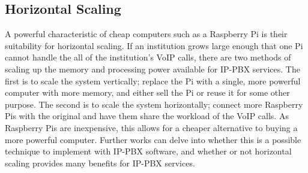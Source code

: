     \subsection{Horizontal Scaling}
        A powerful characteristic of cheap computers such as a Raspberry Pi is their suitability for horizontal scaling. If an institution grows large enough that one Pi cannot handle the all of the institution's VoIP calls, there are two methods of scaling up the memory and processing power available for IP-PBX services. The first is to scale the system vertically; replace the Pi with a single, more powerful computer with more memory, and either sell the Pi or reuse it for some other purpose. The second is to scale the system horizontally; connect more Raspberry Pis with the original and have them share the workload of the VoIP calls. As Raspberry Pis are inexpensive, this allows for a cheaper alternative to buying a more powerful computer. Further works can delve into whether this is a possible technique to implement with IP-PBX software, and whether or not horizontal scaling provides many benefits for IP-PBX services.